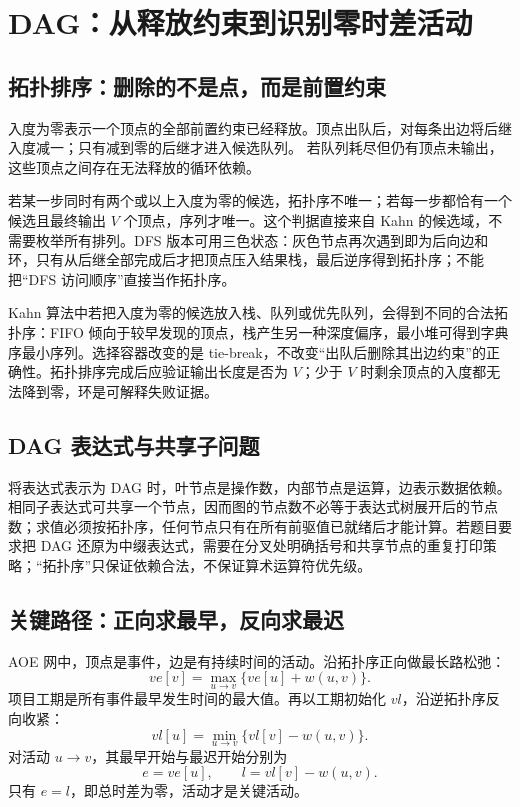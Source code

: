 \documentclass[UTF8,fontset=none,11pt,a4paper]{ctexart}
\begin{document}
\section{DAG：从释放约束到识别零时差活动}

\subsection{拓扑排序：删除的不是点，而是前置约束}
入度为零表示一个顶点的全部前置约束已经释放。顶点出队后，对每条出边将后继入度减一；只有减到零的后继才进入候选队列。
若队列耗尽但仍有顶点未输出，这些顶点之间存在无法释放的循环依赖。

若某一步同时有两个或以上入度为零的候选，拓扑序不唯一；若每一步都恰有一个候选且最终输出 $V$ 个顶点，序列才唯一。这个判据直接来自 Kahn 的候选域，不需要枚举所有排列。DFS 版本可用三色状态：灰色节点再次遇到即为后向边和环，只有从后继全部完成后才把顶点压入结果栈，最后逆序得到拓扑序；不能把“DFS 访问顺序”直接当作拓扑序。

Kahn 算法中若把入度为零的候选放入栈、队列或优先队列，会得到不同的合法拓扑序：FIFO 倾向于较早发现的顶点，栈产生另一种深度偏序，最小堆可得到字典序最小序列。选择容器改变的是 tie-break，不改变“出队后删除其出边约束”的正确性。拓扑排序完成后应验证输出长度是否为 $V$；少于 $V$ 时剩余顶点的入度都无法降到零，环是可解释失败证据。

\subsection{DAG 表达式与共享子问题}
将表达式表示为 DAG 时，叶节点是操作数，内部节点是运算，边表示数据依赖。相同子表达式可共享一个节点，因而图的节点数不必等于表达式树展开后的节点数；求值必须按拓扑序，任何节点只有在所有前驱值已就绪后才能计算。若题目要求把 DAG 还原为中缀表达式，需要在分叉处明确括号和共享节点的重复打印策略；“拓扑序”只保证依赖合法，不保证算术运算符优先级。



\subsection{关键路径：正向求最早，反向求最迟}
AOE 网中，顶点是事件，边是有持续时间的活动。沿拓扑序正向做最长路松弛：
\[
ve[v]=\max_{u\to v}\{ve[u]+w(u,v)\}.
\]
项目工期是所有事件最早发生时间的最大值。再以工期初始化 $vl$，沿逆拓扑序反向收紧：
\[
vl[u]=\min_{u\to v}\{vl[v]-w(u,v)\}.
\]
对活动 $u\to v$，其最早开始与最迟开始分别为
\[
e=ve[u],\qquad l=vl[v]-w(u,v).
\]
只有 $e=l$，即总时差为零，活动才是关键活动。
\end{document}
